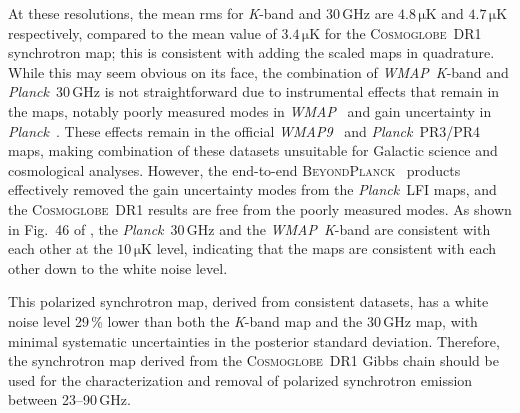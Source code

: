 \documentclass[twocolumn]{../../common/aa}
\def\WMAP{\emph{WMAP}}
\def\WMAPnine{\emph{WMAP9}}
\def\Planck{\emph{Planck}}
\newcommand{\bp}{\textsc{BeyondPlanck}}
\newcommand{\cosmoglobe}{\textsc{Cosmoglobe}}
\newcommand{\K}[0]{\textit K}
\begin{document}
At these resolutions, the mean rms for \K-band and 30\,GHz are $4.8\,\mathrm{\mu K}$ and $4.7\,\mathrm{\mu K}$ respectively, compared to the mean value of $3.4\,\mathrm{\mu K}$ for the \cosmoglobe\ DR1 synchrotron map; this is consistent with adding the scaled maps in quadrature.  While this may seem obvious on its face,  the combination of \WMAP\ \K-band and \Planck\ 30\,GHz is not straightforward due to instrumental effects that remain in the maps, notably poorly measured modes in \WMAP\ \citep{bennett2012,weiland:2018} and gain uncertainty in \Planck\ \citep{planck2016-l02}. These effects remain in the official \WMAPnine\ \citep{bennett2012} and \Planck\ PR3/PR4 \citep{planck2016-l02,planck2020-LVII} maps, making combination of these datasets unsuitable for Galactic science and cosmological analyses. However, the end-to-end \bp\ \citep{bp01} products effectively removed the gain uncertainty modes from the \Planck\ LFI maps, and the \cosmoglobe\ DR1 results \citep{watts2023_dr1} are free from the poorly measured modes. As shown in Fig.~46 of \citet{watts2023_dr1}, the \Planck\ 30\,GHz and the \WMAP\ \K-band are consistent with each other at the $10\,\mathrm{\mu K}$ level, indicating that the maps are consistent with each other down to the white noise level. 

This polarized synchrotron map, derived from consistent datasets, has a white noise level 29\,\% lower than both the \K-band map and the 30\,GHz map, with minimal systematic uncertainties in the posterior standard deviation. Therefore, the synchrotron map derived from the \cosmoglobe\ DR1 Gibbs chain should be used for the characterization and removal of polarized synchrotron emission between 23--90\,GHz.
\end{document}
